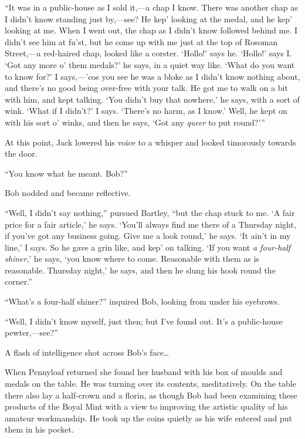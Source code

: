 ``It was in a public-house as I sold it,---a chap I know. There was
another chap as I didn't know standing just by,---see? He kep' looking
at the medal, and he kep' looking at me. When I went out, the chap as I
didn't know followed behind me. I didn't see him at fu'st, but he come
up with me just at the top of Rosoman Street,---a red-haired chap,
looked like a corster. `Hollo!' says he. `Hollo!' says I. `Got any more
o' them {\protect\hypertarget{233}{}{}}medals?' he says, in a quiet way
like. `What do you want to know for?' I says,---'cos you see he was a
bloke as I didn't know nothing about, and there's no good being
over-free with your talk. He got me to walk on a bit with him, and kept
talking. `You didn't buy that nowhere,' he says, with a sort of wink.
`What if I didn't?' I says. `There's no harm, as I know.' Well, he kept
on with his sort o' winks, and then he says, `Got any \emph{queer} to
put round?'''

At this point, Jack lowered his voice to a whisper and looked timorously
towards the door.

``You know what he meant. Bob?''

Bob nodded and became reflective.

``Well, I didn't say nothing,'' pursued Bartley, ``but the chap stuck to
me. `A fair price for a fair article,' he says. `You'll always find me
there of a Thursday night, if you've got any business going. Give me a
look round,' he says. `It ain't in my line,' I says. So he gave a grin
like, and kep' on talking. `If you want \emph{a four-half shiner},' he
says, `you {\protect\hypertarget{234}{}{}}know where to come. Reasonable
with them as is reasonable. Thursday night,' he says, and then he slung
his hook round the corner.''

``What's a four-half shiner?'' inquired Bob, looking from under his
eyebrows.

``Well, I didn't know myself, just then; but I've found out. It's a
public-house pewter,---see?''

A flash of intelligence shot across Bob's face\ldots{}

When Pennyloaf returned she found her husband with his box of moulds and
medals on the table. He was turning over its contents, meditatively. On
the table there also lay a half-crown and a florin, as though Bob had
been examining these products of the Boyal Mint with a view to improving
the artistic quality of his amateur workmanship. He took up the coins
quietly as his wife entered and put them in his pocket.


